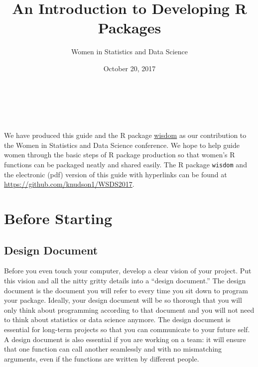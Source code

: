 \documentclass{article}
\title{An Introduction to Developing R Packages}
\author{Women in Statistics and Data Science}
\date{October 20, 2017}
\begin{document}
\maketitle{}

\\
 \\ \\ 



We have  produced this guide and the R package \href{https://github.com/knudson1/WSDS2017}{wisdom} as our contribution to the Women in Statistics and Data Science conference. We hope to help guide women through the basic steps of R package production so that  women's R functions can be packaged neatly and shared easily. The R package \texttt{wisdom} and the electronic (pdf) version of this guide with  hyperlinks can be found at \href{https://github.com/knudson1/WSDS2017}{\url{https://github.com/knudson1/WSDS2017}}. 


\section{Before Starting}




\subsection{Design Document}
Before you even touch your computer, develop a clear vision of your project. Put this vision and all the nitty gritty details  into a ``design document.'' The design document is the document you will refer to every time you sit down to program your package. Ideally,  your design document  will be so thorough that you will only think about programming according to that document and you will not need to think about statistics or data science anymore. The design document is essential for long-term projects so that you can communicate to your future self. A design document is also essential if you are working on a team: it will ensure that one function can call another seamlessly and with no mismatching arguments, even if the functions are written by different people.
\end{document}
